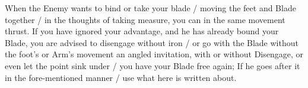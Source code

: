 

When the Enemy wants to bind or take your blade / moving the feet and
Blade together / in the thoughts of taking measure, you can in the
same movement thrust. If you have ignored your advantage, and he has
already bound your Blade, you are advised to disengage without iron /
or go with the Blade without the foot's or Arm's movement an angled
invitation, with or without Disengage, or even let the point sink
under / you have your Blade free again; If he goes after it in the
fore-mentioned manner / use what here is written about.
